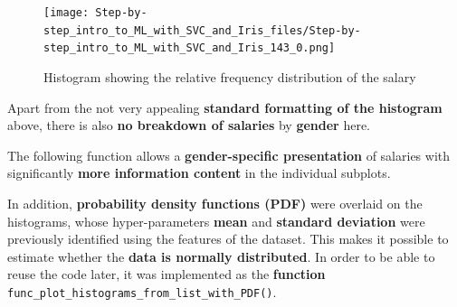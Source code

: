 \documentclass [oneside,10pt,a4paper,ngerman,BCOR10mm,headsepline,parindent,final]{scrartcl}
\begin{document}
    \begin{figure}
        \begin{center}\texttt{[image: Step-by-step\_intro\_to\_ML\_with\_SVC\_and\_Iris\_files/Step-by-step\_intro\_to\_ML\_with\_SVC\_and\_Iris\_143\_0.png]}\end{center}
        \caption{Histogram showing the relative frequency distribution of the salary}
        \label{fig:histogram_salary}
    \end{figure}
    
    Apart from the not very appealing \textbf{standard formatting of the
histogram} above, there is also \textbf{no breakdown of salaries} by
\textbf{gender} here.

The following function allows a \textbf{gender-specific presentation} of
salaries with significantly \textbf{more information content} in the
individual subplots.

In addition, \textbf{probability density functions (PDF)} were overlaid
on the histograms, whose hyper-parameters \textbf{mean} and
\textbf{standard deviation} were previously identified using the
features of the dataset. This makes it possible to estimate whether the
\textbf{data is normally distributed}. In order to be able to reuse the
code later, it was implemented as the \textbf{function}
\texttt{func\_plot\_histograms\_from\_list\_with\_PDF()}.
\end{document}
